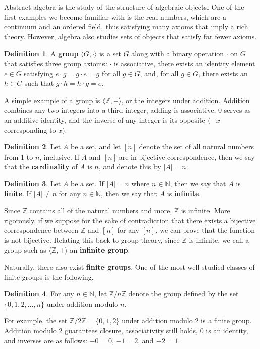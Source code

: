 \documentclass[openany, amssymb, psamsfonts]{amsart}
\theoremstyle{definition}
\newtheorem{defn}{Definition}[section]
\numberwithin{equation}{section}
\begin{document}
Abstract algebra is the study of the structure of algebraic objects. One of the first examples we become familiar with is the real numbers, which are a continuum and an ordered field, thus satisfying many axioms that imply a rich theory. However, algebra also studies sets of objects that satisfy far fewer axioms.\par
\begin{defn}
    A \textbf{group} $\langle G,\cdot\rangle$ is a set $G$ along with a binary operation $\cdot$ on $G$ that satisfies three group axioms: $\cdot$ is associative, there exists an identity element $e\in G$ satisfying $e\cdot g=g\cdot e=g$ for all $g\in G$, and, for all $g\in G$, there exists an $h\in G$ such that $g\cdot h=h\cdot g=e$.
\end{defn}
A simple example of a group is $\langle\mathbb{Z},+\rangle$, or the integers under addition. Addition combines any two integers into a third integer, adding is associative, 0 serves as an additive identity, and the inverse of any integer is its opposite ($-x$ corresponding to $x$).
\begin{defn}
    Let $A$ be a set, and let $[n]$ denote the set of all natural numbers from 1 to $n$, inclusive. If $A$ and $[n]$ are in bijective correspondence, then we say that the \textbf{cardinality} of $A$ is $n$, and denote this by $|A|=n$.
\end{defn}
\begin{defn}
    Let $A$ be a set. If $|A|=n$ where $n\in\mathbb{N}$, then we say that $A$ is \textbf{finite}. If $|A|\neq n$ for any $n\in\mathbb{N}$, then we say that $A$ is \textbf{infinite}.
\end{defn}
Since $\mathbb{Z}$ contains all of the natural numbers and more, $\mathbb{Z}$ is infinite. More rigorously, if we suppose for the sake of contradiction that there exists a bijective correspondence between $\mathbb{Z}$ and $[n]$ for any $[n]$, we can prove that the function is not bijective. Relating this back to group theory, since $\mathbb{Z}$ is infinite, we call a group such as $\langle\mathbb{Z},+\rangle$ an \textbf{infinite group}.\par
Naturally, there also exist \textbf{finite groups}. One of the most well-studied classes of finite groups is the following.
\begin{defn}
    For any $n\in\mathbb{N}$, let $\mathbb{Z}/n\mathbb{Z}$ denote the group defined by the set $\{0,1,2,\dots,n\}$ under addition modulo $n$.
\end{defn}
For example, the set $\mathbb{Z}/2\mathbb{Z}=\{0,1,2\}$ under addition modulo 2 is a finite group. Addition modulo 2 guarantees closure, associativity still holds, 0 is an identity, and inverses are as follows: $-0=0$, $-1=2$, and $-2=1$.\par
\end{document}
